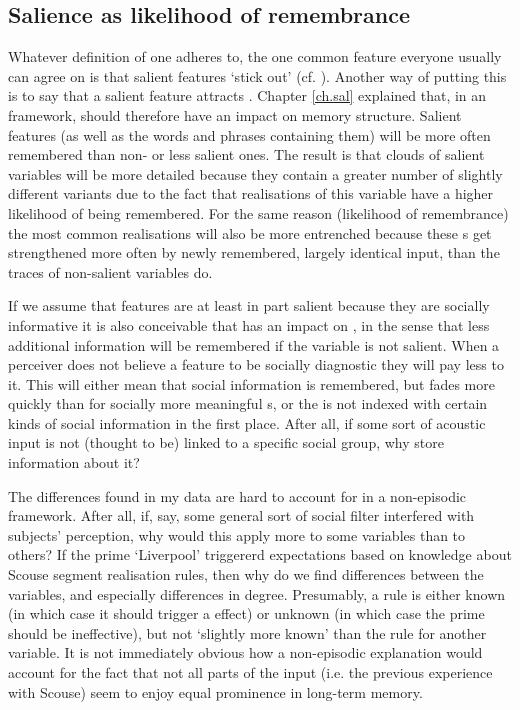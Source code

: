 		\subsection{Salience as likelihood of remembrance}

Whatever definition of  one adheres to, the one common feature everyone usually can agree on is that salient features `stick out' (cf. ).
Another way of putting this is to say that a salient feature attracts .
Chapter \ref{ch.sal} explained that, in an  framework,  should therefore have an impact on memory structure.
Salient features (as well as the words and phrases containing them) will be more often remembered than non- or less salient ones.
The result is that  clouds of salient variables will be more detailed because they contain a greater number of slightly different variants due to the fact that realisations of this variable have a higher likelihood of being remembered.
For the same reason (likelihood of remembrance) the most common realisations will also be more entrenched because these s get strengthened more often by newly remembered, largely identical input, than the traces of non-salient variables do.

If we assume that features are at least in part salient because they are socially informative it is also conceivable that  has an impact on , in the sense that less additional information will be remembered if the variable is not salient.
When a perceiver does not believe a feature to be socially diagnostic they will pay less  to it.
This will either mean that social information is remembered, but fades more quickly than for socially more meaningful s, or the  is not indexed with certain kinds of social information in the first place.
After all, if some sort of acoustic input is not (thought to be) linked to a specific social group, why store information about it?

The  differences found in my data are hard to account for in a non-episodic framework.
After all, if, say, some general sort of social filter \parencite[cf.][]{niedzielski1999} interfered with subjects' perception, why would this apply more to some variables than to others?
If the prime \enquote*{Liverpool} triggererd expectations based on knowledge about Scouse segment realisation rules, then why do we find differences between the variables, and especially differences in degree.
Presumably, a rule is either known (in which case it should trigger a  effect) or unknown (in which case the prime should be ineffective), but not \enquote*{slightly more known} than the rule for another variable.
It is not immediately obvious how a non-episodic explanation would account for the fact that not all parts of the input (i.e. the previous experience with Scouse) seem to enjoy equal prominence in long-term memory.

